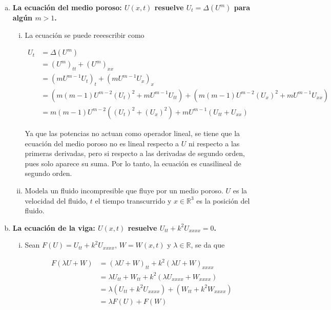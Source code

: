 \documentclass[fleqn]{article}
\newcommand{\real}{\mathbb{R}}
\begin{document}
\begin{enumerate}[(a)]
		\item \textbf{La ecuación del medio poroso: $ U(x,t) $ resuelve $ U_t = \Delta (U^m) $ para algún $ m > 1 $.}
		
		\begin{enumerate}[(i)]
			\item La ecuación se puede reeescribir como 
			
			\begin{align*}
				U_t &= \Delta \left( U^m \right) \\
				&= \left( U^m \right)_{tt} + \left( U^m \right)_{xx} \\
				&= \left( m U^{m-1} U_t \right)_t + \left( m U^{m-1} U_x \right)_x \\
				&= \left( m(m-1) U^{m-2} (U_t)^2 + m U^{m-1} U_{tt} \right) + \left( m(m-1) U^{m-2} (U_x)^2 + m U^{m-1} U_{xx} \right) \\
				&= m(m-1) U^{m-2} \left( (U_t)^2 + (U_x)^2 \right) + m U^{m-1} \left( U_{tt} + U_{xx} \right)
			\end{align*}

			Ya que las potencias no actuan como operador lineal, se tiene que la ecuación del medio poroso no es lineal respecto a $ U $ ni respecto a las primeras derivadas, pero si respecto a las derivadas de segundo orden, pues solo aparece su suma. Por lo tanto, la ecuación es cuasilineal de segundo orden.
			
			\item Modela un fluido incompresible que fluye por un medio poroso. $ U $ es la velocidad del fluido, $ t $ el tiempo transcurrido y $ x \in \real^3 $ es la posición del fluido.
		\end{enumerate}

		\item \textbf{La ecuación de la viga: $ U(x,t) $ resuelve $ U_{tt} + k^2 U_{xxxx} = 0 $.}
		
		\begin{enumerate}[(i)]
			\item Sean $ F(U) = U_{tt} + k^2 U_{xxxx} $, $ W = W(x,t) $ y $ \lambda \in \real $, se da que
			
			\begin{align*}
				F(\lambda U + W) &= (\lambda U + W)_{tt} + k^2 (\lambda U + W)_{xxxx} \\
				&= \lambda U_{tt} + W_{tt} + k^2 (\lambda U_{xxxx} + W_{xxxx}) \\
				&= \lambda (U_{tt} + k^2 U_{xxxx}) + (W_{tt} + k^2 W_{xxxx}) \\
				&= \lambda F(U) + F(W)
			\end{align*}


\end{enumerate}
\end{enumerate}
\end{document}
